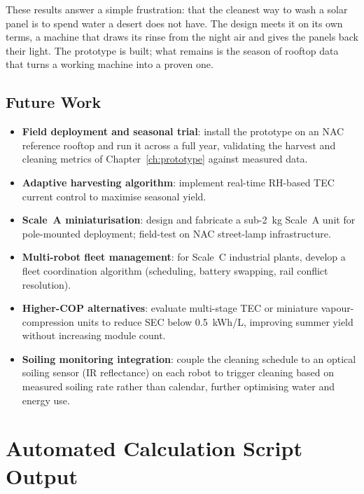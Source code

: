\documentclass[12pt,a4paper]{report}   %
\begin{document}
These results answer a simple frustration: that the cleanest way to wash a solar panel is to
spend water a desert does not have. The design meets it on its own terms, a machine that draws
its rinse from the night air and gives the panels back their light. The prototype is built; what
remains is the season of rooftop data that turns a working machine into a proven one.

\section{Future Work}

\begin{itemize}[leftmargin=*]
  \item \textbf{Field deployment and seasonal trial}: install the prototype on an NAC reference
  rooftop and run it across a full year, validating the harvest and cleaning metrics of
  Chapter~\ref{ch:prototype} against measured data.
  \item \textbf{Adaptive harvesting algorithm}: implement real-time RH-based TEC current control
  to maximise seasonal yield.
  \item \textbf{Scale~A miniaturisation}: design and fabricate a sub-2~kg Scale~A unit for
  pole-mounted deployment; field-test on NAC street-lamp infrastructure.
  \item \textbf{Multi-robot fleet management}: for Scale~C industrial plants, develop a fleet
  coordination algorithm (scheduling, battery swapping, rail conflict resolution).
  \item \textbf{Higher-COP alternatives}: evaluate multi-stage TEC or miniature vapour-compression
  units to reduce SEC below 0.5~kWh/L, improving summer yield without increasing module count.
  \item \textbf{Soiling monitoring integration}: couple the cleaning schedule to an optical soiling
  sensor (IR reflectance) on each robot to trigger cleaning based on measured soiling rate rather
  than calendar, further optimising water and energy use.
\end{itemize}




\appendix
\chapter{Automated Calculation Script Output}
\end{document}
